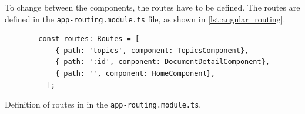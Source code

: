 To change between the components, the routes have to be defined.
The routes are defined in the \texttt{app-routing.module.ts} file, as shown in \autoref{lst:angular_routing}.

\begin{listing}[htp]
    \begin{verbatim}
        const routes: Routes = [
            { path: 'topics', component: TopicsComponent},
            { path: ':id', component: DocumentDetailComponent},
            { path: '', component: HomeComponent},
          ];
    \end{verbatim}
    \caption[Definition of routes using \angular{}]{Definition of routes in \angular{} in the \texttt{app-routing.module.ts}.
    }
    \label{lst:angular_routing}
\end{listing}